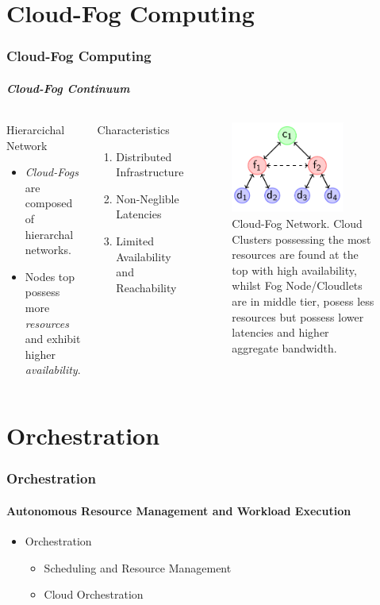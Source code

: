 \documentclass{beamer}
\begin{document}
\section{Cloud-Fog Computing}
\begin{frame}
	\frametitle{Cloud-Fog Computing}
	\framesubtitle{\textit{Cloud-Fog Continuum}}
	\begin{columns}[T] %
		\begin{block}{Hierarcichal Network}
			\begin{itemize}
				\item \textit{Cloud-Fogs} are composed of hierarchal networks.
				\item Nodes top possess more \textit{resources} and exhibit higher \textit{availability}.
			\end{itemize}
		\end{block}
		\begin{block}{Characteristics}
			\begin{enumerate}
				\item Distributed Infrastructure
				\item Non-Neglible Latencies
				\item Limited Availability and Reachability
			\end{enumerate}
			
		\end{block}

		\begin{figure}
			\includegraphics[height=3cm]{img/cloud-fog.png}
			\caption{\centering Cloud-Fog Network. Cloud Clusters possessing the most resources are found at the top with high availability, whilst Fog Node/Cloudlets are in middle tier, posess less resources but possess lower latencies and higher aggregate bandwidth.}
		\end{figure}	
\end{columns}
\end{frame}

\section{Orchestration}
\begin{frame}
	\frametitle{Orchestration}
	\framesubtitle{Autonomous Resource Management and Workload Execution}
	\begin{itemize}
		\item Orchestration
		\begin{itemize}
			\item Scheduling and Resource Management
			\item Cloud Orchestration
		\end{itemize}
	\end{itemize}
\end{frame}
\end{document}

